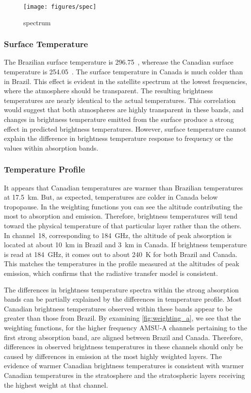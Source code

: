 \documentclass[twocol]{ametsoc}
\begin{document}
\begin{figure}
	\centering
	\texttt{[image: figures/spec]}
	\caption{spectrum}
	\label{fig:spec}
\end{figure}

\subsubsection{Surface Temperature}

The Brazilian surface temperature is 296.75~, wherease the Canadian surface temperature is 254.05~.
The surface temperature in Canada is much colder than in Brazil.
This effect is evident in the satellite spectrum at the lowest frequencies, where the atmosphere should be transparent.
The resulting brightness temperatures are nearly identical to the actual temperatures.
This correlation would suggest that both atmospheres are highly transparent in these bands, and changes in brightness temperature emitted from the surface produce a strong effect in predicted brightness temperatures.
However, surface temperature cannot explain the difference in brightness temperature response to frequency or the values within absorption bands.

\subsubsection{Temperature Profile}

It appears that Canadian temperatures are warmer than Brazilian temperatures at 17.5~km.
But, as expected, temperatures are colder in Canada below tropopause.
In the weighting functions you can see the altitude contributing the most to absorption and emission. Therefore, brightness temperatures will tend toward the physical temperature of that particular layer rather than the others.
In channel~18, corresponding to 184~GHz, the altitude of peak absorption is located at about 10~km in Brazil and 3~km in Canada.
If brightness temperature is read at 184~GHz, it comes out to about 240~K for both Brazil and Canada.
This matches the temperatures in the profile measured at the altitudes of peak emission, which confirms that the radiative transfer model is consistent.

The differences in brightness temperature spectra within the strong absorption bands can be partially explained by the differences in temperature profile.
Most Canadian brightness temperatures observed within these bands appear to be greater than those from Brazil.
By examining \autoref{fig:weighting_a}, we see that the weighting functions, for the higher frequency AMSU-A channels pertaining to the first strong absorption band, are aligned between Brazil and Canada.
Therefore, differences in observed brightness temperatures in these channels should only be caused by differences in emission at the most highly weighted layers.
The evidence of warmer Canadian brightness temperatures is consistent with warmer Canadian temperatures in the stratosphere and the stratospheric layers receiving the highest weight at that channel.
\end{document}
